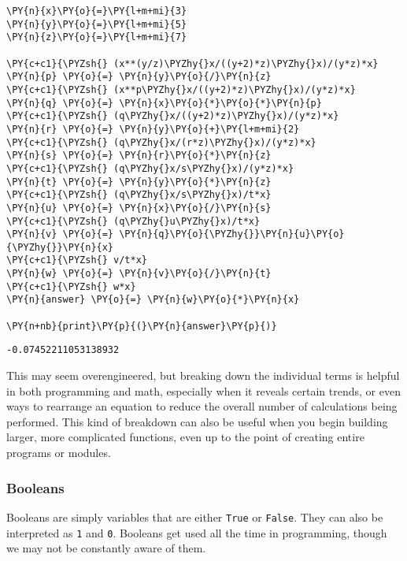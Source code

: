     \begin{tcolorbox}[breakable, size=fbox, boxrule=1pt, pad at break*=1mm,colback=cellbackground, colframe=cellborder]
\begin{Verbatim}[commandchars=\\\{\}]
\PY{n}{x}\PY{o}{=}\PY{l+m+mi}{3}
\PY{n}{y}\PY{o}{=}\PY{l+m+mi}{5}
\PY{n}{z}\PY{o}{=}\PY{l+m+mi}{7}

\PY{c+c1}{\PYZsh{} (x**(y/z)\PYZhy{}x/((y+2)*z)\PYZhy{}x)/(y*z)*x}
\PY{n}{p} \PY{o}{=} \PY{n}{y}\PY{o}{/}\PY{n}{z}
\PY{c+c1}{\PYZsh{} (x**p\PYZhy{}x/((y+2)*z)\PYZhy{}x)/(y*z)*x}
\PY{n}{q} \PY{o}{=} \PY{n}{x}\PY{o}{*}\PY{o}{*}\PY{n}{p}
\PY{c+c1}{\PYZsh{} (q\PYZhy{}x/((y+2)*z)\PYZhy{}x)/(y*z)*x}
\PY{n}{r} \PY{o}{=} \PY{n}{y}\PY{o}{+}\PY{l+m+mi}{2}
\PY{c+c1}{\PYZsh{} (q\PYZhy{}x/(r*z)\PYZhy{}x)/(y*z)*x}
\PY{n}{s} \PY{o}{=} \PY{n}{r}\PY{o}{*}\PY{n}{z}
\PY{c+c1}{\PYZsh{} (q\PYZhy{}x/s\PYZhy{}x)/(y*z)*x}
\PY{n}{t} \PY{o}{=} \PY{n}{y}\PY{o}{*}\PY{n}{z}
\PY{c+c1}{\PYZsh{} (q\PYZhy{}x/s\PYZhy{}x)/t*x}
\PY{n}{u} \PY{o}{=} \PY{n}{x}\PY{o}{/}\PY{n}{s}
\PY{c+c1}{\PYZsh{} (q\PYZhy{}u\PYZhy{}x)/t*x}
\PY{n}{v} \PY{o}{=} \PY{n}{q}\PY{o}{\PYZhy{}}\PY{n}{u}\PY{o}{\PYZhy{}}\PY{n}{x}
\PY{c+c1}{\PYZsh{} v/t*x}
\PY{n}{w} \PY{o}{=} \PY{n}{v}\PY{o}{/}\PY{n}{t}
\PY{c+c1}{\PYZsh{} w*x}
\PY{n}{answer} \PY{o}{=} \PY{n}{w}\PY{o}{*}\PY{n}{x}

\PY{n+nb}{print}\PY{p}{(}\PY{n}{answer}\PY{p}{)}
\end{Verbatim}
\end{tcolorbox}

    \begin{Verbatim}[commandchars=\\\{\}]
-0.07452211053138932
    \end{Verbatim}

    This may seem overengineered, but breaking down the individual terms is
helpful in both programming and math, especially when it reveals certain
trends, or even ways to rearrange an equation to reduce the overall
number of calculations being performed. This kind of breakdown can also
be useful when you begin building larger, more complicated functions,
even up to the point of creating entire programs or modules.

\hypertarget{booleans}{%
\subsubsection{Booleans}\label{booleans}}

Booleans are simply variables that are either \texttt{True} or
\texttt{False}. They can also be interpreted as \texttt{1} and
\texttt{0}. Booleans get used all the time in programming, though we may
not be constantly aware of them.

